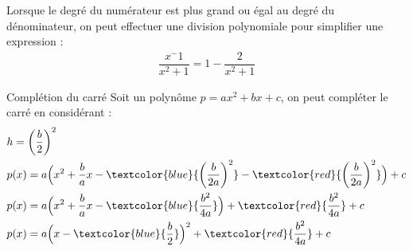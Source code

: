 \documentclass{report}
\begin{document}
\begin{multicols*}{3}
\begin{note}{}{}
    Lorsque le degré du numérateur est plus grand ou égal au degré du dénominateur, on peut effectuer une division 
    polynomiale pour simplifier une expression : 
    \begin{align*}
      \dfrac{x^-1}{x^2 +1} = 1 - \dfrac{2}{x^2 +1}
    \end{align*}
\end{note}



\begin{Concept}{Complétion du carré}{}
  Soit un polynôme $p = ax^2 + bx + c$, on peut compléter le carré en considérant : 
  \begin{align*}
  &h = \left(\dfrac{b}{2}\right)^2 \\ 
  &p(x) = a\Bigl(x^2 + \dfrac{b}{a}x - \textcolor{blue}{\left(\dfrac{b}{2a}\right)^2} 
  - \textcolor{red}{\left(\dfrac{b}{2a}\right)^2}\Bigr)  + c               
  \\
  &p(x) = a\Bigl(x^2 + \dfrac{b}{a} x - \textcolor{blue}{\dfrac{b^2}{4a}}\Bigr) + \textcolor{red}{\dfrac{b^2}{4a}}  + c   
  \\
  &p(x) = a\Bigl(x - \textcolor{blue}{\dfrac{b}{2}}\Bigr)^2 +  
  \textcolor{red}{\dfrac{b^2}{4a}}  + c  
  \end{align*}


  
\end{Concept}

\end{multicols*}
\end{document}
